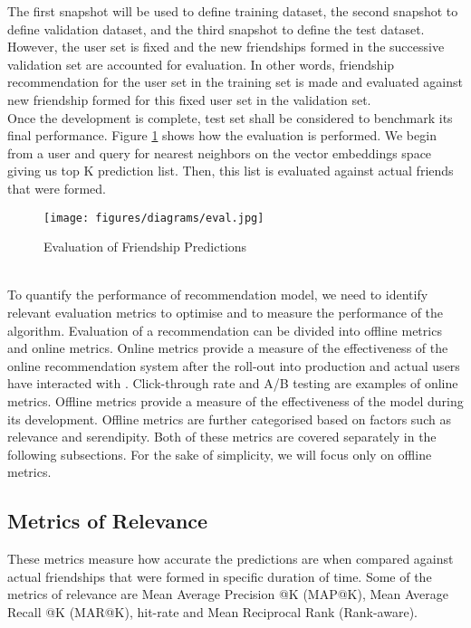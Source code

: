 \documentclass{kththesis}
\begin{document}
The first snapshot will be used to define training dataset, the second snapshot to define validation dataset, and the third snapshot to define the test dataset. However, the user set is fixed and the new friendships formed in the successive validation set are accounted for evaluation. In other words, friendship recommendation for the user set in the training set is made and evaluated against new friendship formed for this fixed user set in the validation set. \\

Once the development is complete, test set shall be considered to benchmark its final performance. Figure \ref{fig:eval} shows how the evaluation is performed. We begin from a user and query for nearest neighbors on the vector embeddings space giving us top K prediction list. Then, this list is evaluated against actual friends that were formed. \\

\begin{figure}[h!]
\centering
\texttt{[image: figures/diagrams/eval.jpg]}
\caption{Evaluation of Friendship Predictions}
\label{fig:eval}
\end{figure}\\

\newpage
To quantify the performance of recommendation model, we need to identify relevant evaluation metrics to optimise and to measure the performance of the algorithm. Evaluation of a recommendation can be divided into offline metrics and online metrics. Online metrics provide a measure of the effectiveness of the online recommendation system after the roll-out into production and actual users have interacted with \cite{eval}. Click-through rate and A/B testing are examples of online metrics. Offline metrics provide a measure of the effectiveness of the model during its development. Offline metrics are further categorised based on factors such as relevance and serendipity. Both of these metrics are covered separately in the following subsections. For the sake of simplicity, we will focus only on offline metrics.

\subsection{Metrics of Relevance}
\noindent These metrics measure how accurate the predictions are when compared against actual friendships that were formed in specific duration of time. Some of the metrics of relevance are Mean Average Precision @K (MAP@K), Mean Average Recall @K (MAR@K), hit-rate and Mean Reciprocal Rank (Rank-aware).
\end{document}
